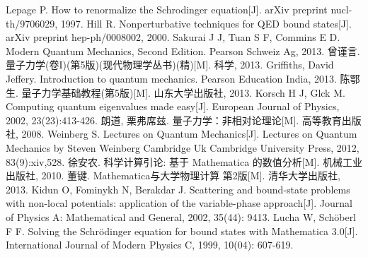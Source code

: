 \documentclass[hyperref,cs4size,titlepage,twoside]{ctexart}
\begin{document}
\clearpage
\begin{thebibliography}{b}

Lepage P. How to renormalize the Schrodinger equation[J]. arXiv preprint nucl-th/9706029, 1997.
Hill R. Nonperturbative techniques for QED bound states[J]. arXiv preprint hep-ph/0008002, 2000.
Sakurai J J, Tuan S F, Commins E D. Modern Quantum Mechanics, Second Edition. Pearson Schweiz Ag, 2013.
曾谨言. 量子力学(卷I)(第5版)(现代物理学丛书)(精)[M]. 科学, 2013.
Griffiths, David Jeffery. Introduction to quantum mechanics. Pearson Education India, 2013.
陈鄂生. 量子力学基础教程(第5版)[M]. 山东大学出版社, 2013.
Korsch H J, Glck M. Computing quantum eigenvalues made easy[J]. European Journal of Physics, 2002, 23(23):413-426.
朗道, 栗弗席兹. 量子力学：非相对论理论[M]. 高等教育出版社, 2008.
Weinberg S. Lectures on Quantum Mechanics[J]. Lectures on Quantum Mechanics by Steven Weinberg Cambridge Uk Cambridge University Press, 2012, 83(9):xiv,528.
徐安农. 科学计算引论: 基于 Mathematica 的数值分析[M]. 机械工业出版社, 2010.
董键. Mathematica与大学物理计算 第2版[M]. 清华大学出版社, 2013.
Kidun O, Fominykh N, Berakdar J. Scattering and bound-state problems with non-local potentials: application of the variable-phase approach[J]. Journal of Physics A: Mathematical and General, 2002, 35(44): 9413.
Lucha W, Schöberl F F. Solving the Schrödinger equation for bound states with Mathematica 3.0[J]. International Journal of Modern Physics C, 1999, 10(04): 607-619.

\end{thebibliography}
\end{document}
